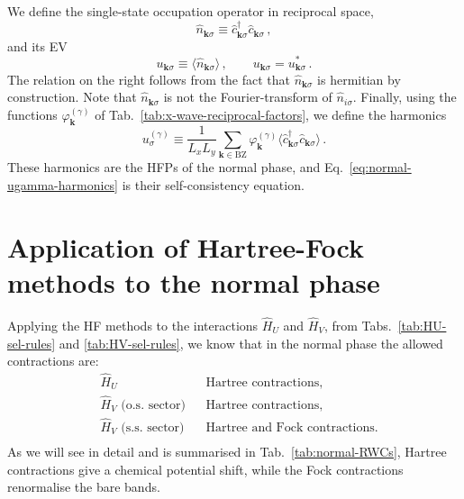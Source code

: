 We define the single-state occupation operator in reciprocal space,
\[
\hat n_{\mathbf{k}\sigma} \equiv \hat c_{\mathbf{k}\sigma}^\dagger \hat c_{\mathbf{k}\sigma} \, ,
\]
and its EV
\begin{equation}\label{eq:normal-uqsigma-def}
	u_{\mathbf{k}\sigma} \equiv \langle
	\hat n_{\mathbf{k}\sigma}
	\rangle \, ,
	\qquad
	u_{\mathbf{k}\sigma} = u_{\mathbf{k}\sigma}^* \, .
\end{equation}
The relation on the right follows from the fact that $\hat n_{\mathbf{k}\sigma}$ is hermitian by construction. Note that $\hat n_{\mathbf{k}\sigma}$ is not the Fourier-transform of $\hat n_{i\sigma}$. Finally, using the functions $\varphi_\mathbf{k}^{(\gamma)}$ of Tab.~\ref{tab:x-wave-reciprocal-factors}, we define the harmonics
\begin{equation}\label{eq:normal-ugamma-harmonics}
	u^{(\gamma)}_\sigma \equiv \frac{1}{L_x L_y} \sum_{\mathbf{k}\in\mathrm{BZ}} \varphi_\mathbf{k}^{(\gamma)}
	\langle
	\hat c_{\mathbf{k}\sigma}^\dagger
	\hat c_{\mathbf{k}\sigma}
	\rangle \, .
\end{equation}
These harmonics are the HFPs of the normal phase, and Eq.~\eqref{eq:normal-ugamma-harmonics} is their self-consistency equation.

\section{Application of Hartree-Fock methods to the normal phase}\label{sec:normal-hf}

Applying the HF methods to the interactions $\hat H_U$ and $\hat H_V$, from Tabs.~\ref{tab:HU-sel-rules} and \ref{tab:HV-sel-rules}, we know that in the normal phase the allowed contractions are:
\[
\begin{aligned}
	&\hat H_U 
	&&\text{Hartree contractions,} \\
	&\hat H_V \text{ (o.s. sector)}
	&&\text{Hartree contractions,} \\
	&\hat H_V \text{ (s.s. sector)}
	&&\text{Hartree and Fock contractions.} \\
\end{aligned}	
\]
As we will see in detail and is summarised in Tab.~\ref{tab:normal-RWCs}, Hartree contractions give a chemical potential shift, while the Fock contractions renormalise the bare bands.

